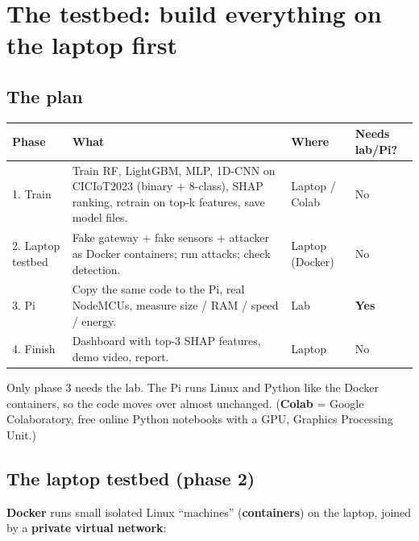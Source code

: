\documentclass[11pt]{article}
\begin{document}
\section{The testbed: build everything on the laptop first}

\subsection*{The plan}
\begin{center}
\begin{tabular}{@{}l >{\raggedright}p{6.8cm} l l@{}}
\toprule
\textbf{Phase} & \textbf{What} & \textbf{Where} & \textbf{Needs lab/Pi?} \\
\midrule
1. Train & Train RF, LightGBM, MLP, 1D-CNN on CICIoT2023 (binary + 8-class), SHAP ranking, retrain on top-k features, save model files. & Laptop / Colab & No \\
2. Laptop testbed & Fake gateway + fake sensors + attacker as Docker containers; run attacks; check detection. & Laptop (Docker) & No \\
3. Pi & Copy the same code to the Pi, real NodeMCUs, measure size / RAM / speed / energy. & Lab & \textbf{Yes} \\
4. Finish & Dashboard with top-3 SHAP features, demo video, report. & Laptop & No \\
\bottomrule
\end{tabular}
\end{center}
Only phase 3 needs the lab. The Pi runs Linux and Python like the Docker containers, so the code moves over almost unchanged.
(\textbf{Colab} = Google Colaboratory, free online Python notebooks with a GPU, Graphics Processing Unit.)

\subsection*{The laptop testbed (phase 2)}
\textbf{Docker} runs small isolated Linux ``machines'' (\textbf{containers}) on the laptop, joined by a \textbf{private virtual network}:
\end{document}
